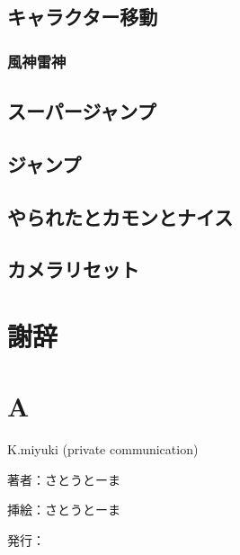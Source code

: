 \documentclass[a4paper,11pt]{jsbook}
\begin{document}
\section{キャラクター移動}
\subsection{風神雷神}
\section{スーパージャンプ}
\section{ジャンプ}
\section{やられたとカモンとナイス}
\section{カメラリセット}


\chapter{謝辞}

\appendix
\chapter{A}



\begin{thebibliography}{2}

K.miyuki (private communication)
\end{thebibliography}

\thispagestyle{empty}
\begin{flushright}
\begin{minipage}{0.5\hsize}
\begin{description}
  \item{著者：}さとうとーま
  \item{挿絵：}さとうとーま
  \item{発行：}\date{\today}
\end{description}
\end{minipage}
\end{flushright}
\end{document}
